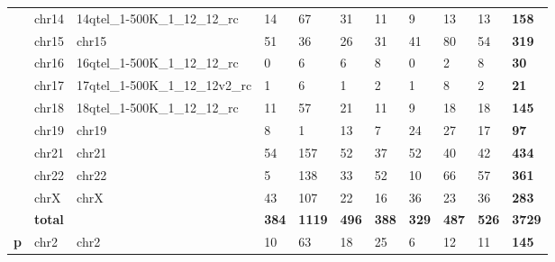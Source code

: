 \begin{samepage}
\begin{table}[h!]
\begin{tabular}{lllllllllll}
\textbf{}      & chr14               & 14qtel\_1-500K\_1\_12\_12\_rc   & 14             & 67             & 31             & 11             & 9              & 13             & 13             & \textbf{158}   \\
\textbf{}      & chr15               & chr15                           & 51             & 36             & 26             & 31             & 41             & 80             & 54             & \textbf{319}   \\
\textbf{}      & chr16               & 16qtel\_1-500K\_1\_12\_12\_rc   & 0              & 6              & 6              & 8              & 0              & 2              & 8              & \textbf{30}    \\
\textbf{}      & chr17               & 17qtel\_1-500K\_1\_12\_12v2\_rc & 1              & 6              & 1              & 2              & 1              & 8              & 2              & \textbf{21}    \\
\textbf{}      & chr18               & 18qtel\_1-500K\_1\_12\_12\_rc   & 11             & 57             & 21             & 11             & 9              & 18             & 18             & \textbf{145}   \\
\textbf{}      & chr19               & chr19                           & 8              & 1              & 13             & 7              & 24             & 27             & 17             & \textbf{97}    \\
\textbf{}      & chr21               & chr21                           & 54             & 157            & 52             & 37             & 52             & 40             & 42             & \textbf{434}   \\
\textbf{}      & chr22               & chr22                           & 5              & 138            & 33             & 52             & 10             & 66             & 57             & \textbf{361}   \\
\textbf{}      & chrX                & chrX                            & 43             & 107            & 22             & 16             & 36             & 23             & 36             & \textbf{283}   \\
\textbf{}      & \textbf{total}      & \textbf{}                       & \textbf{384}   & \textbf{1119}  & \textbf{496}   & \textbf{388}   & \textbf{329}   & \textbf{487}   & \textbf{526}   & \textbf{3729}  \\
\textbf{p}     & chr2                & chr2                            & 10             & 63             & 18             & 25             & 6              & 12             & 11             & \textbf{145}   \\

\end{tabular}
\end{table}
\end{samepage}
